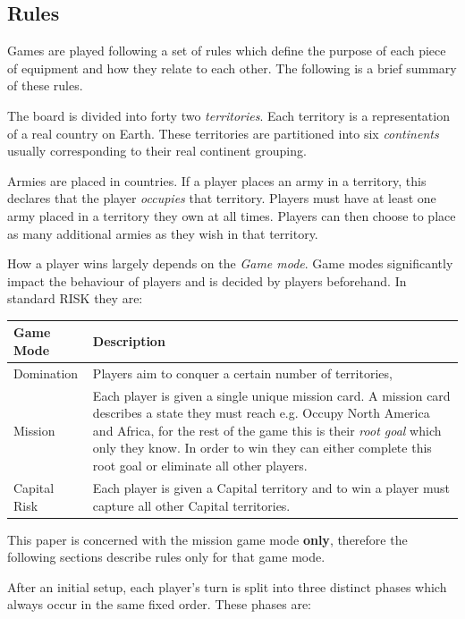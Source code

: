 \documentclass[parskip]{cs4rep}
\begin{document}
\subsection{Rules}

Games are played following a set of rules which define the purpose of each piece of equipment and how they relate to each other. The following is a brief summary of these rules.

The board is divided into forty two \textit{territories}. Each territory is a representation of a real country on Earth. These territories are partitioned into six \textit{continents} usually corresponding to their real continent grouping.

Armies are placed in countries. If a player places an army in a territory, this declares that the player \textit{occupies} that territory. Players must have at least one army placed in a territory they own at all times. Players can then choose to place as many additional armies as they wish in that territory.

How a player wins largely depends on the \textit{Game mode}. Game modes significantly impact the behaviour of players and is decided by players beforehand. In standard RISK they are:
\newline

\begin{tabular}{|l|p{11cm}|}
\hline 
\textbf{Game Mode} & \textbf{Description} \\ 
\hline 
Domination & Players aim to conquer a certain number of territories, \\ 
\hline 
Mission & Each player is given a single unique mission card. A mission card describes a state they must reach e.g. Occupy North America and Africa, for the rest of the game this is their \textit{root goal} which only they know. In order to win they can either complete this root goal or eliminate all other players. \\ 
\hline 
Capital Risk & Each player is given a Capital territory and to win a player must capture all other Capital territories. \\ 
\hline
\end{tabular} 
\newline

This paper is concerned with the mission game mode \textbf{only}, therefore the following sections describe rules only for that game mode.

After an initial setup, each player's turn is split into three distinct phases which always occur in the same fixed order. These phases are:
\end{document}
